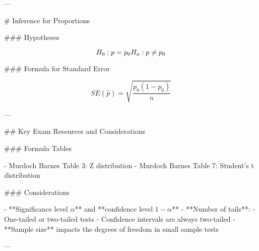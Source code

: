 ---

# Inference for Proportions

### Hypotheses

\[
H_0: p = p_0 \\
H_a: p \neq p_0
\]

### Formula for Standard Error

\[
SE(\hat{p}) = \sqrt{ \frac{p_0(1 - p_0)}{n} }
\]

---

## Key Exam Resources and Considerations

### Formula Tables

- Murdoch Barnes Table 3: Z distribution
- Murdoch Barnes Table 7: Student’s t distribution

### Considerations

- **Significance level \( \alpha \)** and **confidence level \( 1 - \alpha \)**
- **Number of tails**:
  - One-tailed or two-tailed tests
  - Confidence intervals are always two-tailed
- **Sample size** impacts the degrees of freedom in small sample tests

---
